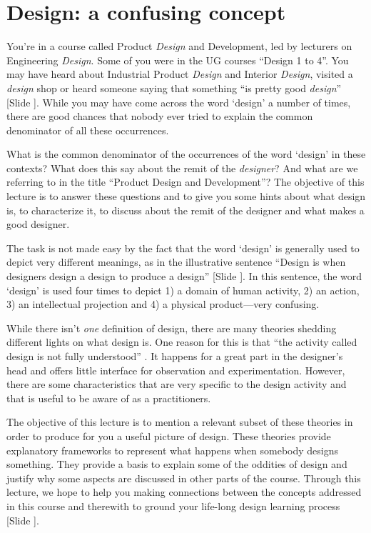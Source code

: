 \documentclass{article}
\newcounter{slide}
\begin{document}
\section{Design: a confusing concept}
\label{sec:motivations}
You're in a course called Product \emph{Design} and Development, led by lecturers on Engineering \emph{Design}. Some of you were in the UG courses ``Design 1 to 4''. You may have heard about Industrial Product \emph{Design} and Interior \emph{Design}, visited a \emph{design} shop or heard someone saying that something ``is pretty good \emph{design}'' {\color{blue}[Slide ]}. While you may have come across the word `design' a number of times, there are good chances that nobody ever tried to explain the common denominator of all these occurrences. 

What is the common denominator of the occurrences of the word `design' in these contexts? What does this say about the remit of the \emph{designer}? And what are we referring to in the title ``Product Design and Development''? The objective of this lecture is to answer these questions and to give you some hints about what design is, to characterize it, to discuss about the remit of the designer and what makes a good designer. 

The task is not made easy by the fact that the word `design' is generally used to depict very different meanings, as in the illustrative sentence ``Design is when designers design a design to produce a design'' {\color{blue}[Slide ]}\cite{heskett2001past}. In this sentence, the word `design' is used four times to depict 1) a domain of human activity, 2) an action, 3) an intellectual projection and 4) a physical product---very confusing. 

While there isn't \emph{one} definition of design, there are many theories shedding different lights on what design is. One reason for this is that ``the activity called design is not fully understood'' \cite{hybsEvolutionaryProcessModel1992}. It happens for a great part in the designer's head and offers little interface for observation and experimentation. However, there are some characteristics that are very specific to the design activity and that is useful to be aware of as a practitioners. 

The objective of this lecture is to mention a relevant subset of these theories in order to produce for you a useful picture of design. These theories provide explanatory frameworks to represent what happens when somebody designs something. They provide a basis to explain some of the oddities of design and justify why some aspects are discussed in other parts of the course. Through this lecture, we hope to help you making connections between the concepts addressed in this course and therewith to ground your life-long design learning process {\color{blue}[Slide ]}.
\end{document}
